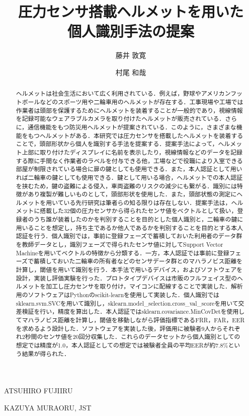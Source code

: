 \documentclass[Japanese,noauthor]{dicomopapers}
\begin{document}
\title{圧力センサ搭載ヘルメットを用いた\\個人識別手法の提案}


\author{藤井 敦寛}{ATSUHIRO FUJII}{RU}
\author{村尾 和哉}{KAZUYA MURAO}{RU, JST}

\begin{abstract}
ヘルメットは社会生活において広く利用されている．例えば，野球やアメリカンフットボールなどのスポーツ用や二輪車用のヘルメットが存在する．工事現場や工場では作業者は頭部を保護するためにヘルメットを装着することが一般的であり，視線情報を記録可能なウェアラブルカメラを取り付けたヘルメットが販売されている．さらに，通信機能をもつ防災用ヘルメット\cite{disaster}が提案されている．このように，さまざまな機能をもつヘルメットがある．本研究では圧力センサを搭載したヘルメットを装着することで，頭部形状から個人を識別する手法を提案する．提案手法によって，ヘルメット上部に取り付けたディスプレイに名前を表示したり，視線情報などのデータを記録する際に手間なく作業者のラベルを付与できる他，工場などで役職により入室できる部屋が制限されている場合に扉の鍵としても使用できる．また，本人認証として用いれば二輪車の鍵としても使用できる．鍵として用いる場合，ヘルメットでの本人認証を挟むため，鍵の盗難による侵入，車両盗難のリスクの減少にも繋がる．識別には特徴があり複製が難しいものとして，頭部形状を使用した．また，頭部状態の測定にヘルメットを用いている先行研究は筆者らの知る限りは存在しない．提案手法は，ヘルメットに搭載した32個の圧力センサから得られたセンサ値をベクトルとして扱い，登録者のうち誰が装着したのかを判別することを目的とした個人識別と，二輪車の鍵に用いることを想定し，持ち主であるか他人であるかを判別することを目的とする本人認証を行う．個人識別では，事前に登録フェーズで蓄積しておいた利用者のデータ群を教師データとし，識別フェーズで得られたセンサ値に対してSupport Vector Machineを用いてベクトルの特徴から分類する．一方，本人認証では事前に登録フェーズで蓄積しておいた二輪車の所有者などのセンサデータ群とのマハラノビス距離を計算し，閾値を用いて識別を行う．本手法で用いるデバイス，およびソフトウェアを設計，実装し評価実験を行った．プロトタイプデバイスは市販のフルフェイス型のヘルメットを加工し圧力センサを取り付け，マイコンに配線することで実装した．解析用のソフトウェアはPythonのscikit-learnを使用して実装した．個人識別ではsklearn.svm.SVCを用いて識別し，sklearn.model\_selection.cross\_val\_scoreを用いて交差検証を行い，精度を算出した．本人認証ではsklearn.covariance.MinCovDetを使用してマハラノビス距離を計算し，閾値を移動しながら評価指標であるFRR，FAR，EERを求めるよう設計した．ソフトウェアを実装した後，評価用に被験者9人からそれぞれ2秒間のセンサ値を20回分収集した．これらのデータセットから個人識別としての想定では精度が1.0，本人認証としての想定では被験者全員の平均EERが約7.8\%という結果が得られた．
\end{abstract}
\end{document}
